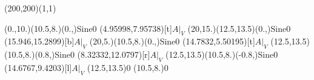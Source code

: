\unitlength=1bp%

\begin{feynartspicture}(200,200)(1,1)

\FADiagram{}
\FAProp(0.,10.)(10.5,8.)(0.,){Sine}{0}
\FALabel(4.95998,7.95738)[t]{$A|_V$}
\FAProp(20,15.)(12.5,13.5)(0.,){Sine}{0}
\FALabel(15.946,15.2899)[b]{$A|_V$}
\FAProp(20,5.)(10.5,8.)(0.,){Sine}{0}
\FALabel(14.7832,5.50195)[t]{$A|_V$}
\FAProp(12.5,13.5)(10.5,8.)(0.8,){Sine}{0}
\FALabel(8.32332,12.0797)[r]{$A|_V$}
\FAProp(12.5,13.5)(10.5,8.)(-0.8,){Sine}{0}
\FALabel(14.6767,9.4203)[l]{$A|_V$}
\FAVert(12.5,13.5){0}
\FAVert(10.5,8.){0}
\end{feynartspicture}

